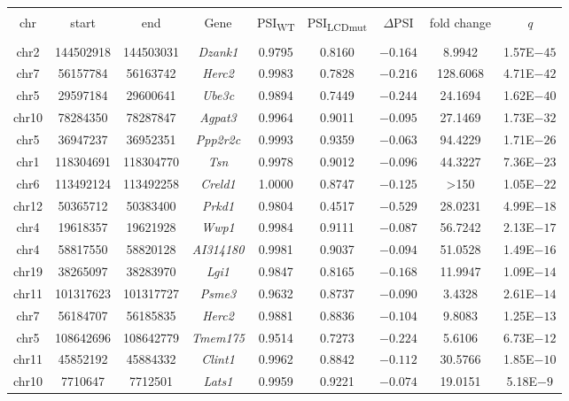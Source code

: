 \begin{appendices}
\begin{table}[!htbp]
\begin{tabular}{@{\extracolsep{5pt}} ccccccccc}
	\\[-1.8ex]\hline 
	\hline \\[-1.8ex] 
	chr & start & end & Gene & PSI\textsubscript{WT} & PSI\textsubscript{LCDmut} & $\Delta$PSI & fold change & \textit{q} \\ 
	\hline \\[-1.8ex] 
	chr2 & 144502918 &144503031 & \textit{Dzank1} & 0.9795 & 0.8160 & $-0.164$ & 8.9942 & 1.57E$-45$ \\ 
	chr7 & 56157784 & 56163742 & \textit{Herc2} & 0.9983 & 0.7828 & $-0.216$ & 128.6068 & 4.71E$-42$\\ 
	chr5 & 29597184 & 29600641 & \textit{Ube3c} & 0.9894 & 0.7449 & $-0.244$ & 24.1694 & 1.62E$-40$\\ 
	chr10 & 78284350 & 78287847 & \textit{Agpat3} & 0.9964 & 0.9011 & $-0.095$ & 27.1469 & 1.73E$-32$ \\ 
	chr5 & 36947237 & 36952351 & \textit{Ppp2r2c} & 0.9993 & 0.9359 & $-0.063$ & 94.4229 & 1.71E$-26$\\ 
	chr1 & 118304691  &118304770& \textit{Tsn} & 0.9978 & 0.9012 & $-0.096$ & 44.3227 & 7.36E$-23$ \\ 
	chr6 & 113492124  & 113492258 & \textit{Creld1} & 1.0000 & 0.8747 & $-0.125$ & \textgreater 150 & 1.05E$-22$ \\ 
	chr12 & 50365712 & 50383400 & \textit{Prkd1} & 0.9804 & 0.4517 & $-0.529$ & 28.0231 & 4.99E$-18$\\ 
	chr4 & 19618357 & 19621928 & \textit{Wwp1} & 0.9984 & 0.9111 & $-0.087$ & 56.7242 & 2.13E$-17$ \\ 
	chr4 & 58817550 & 58820128 & \textit{AI314180} & 0.9981 & 0.9037 & $-0.094$ & 51.0528 & 1.49E$-16$\\ 
	chr19 & 38265097 & 38283970 & \textit{Lgi1} & 0.9847 & 0.8165 & $-0.168$ & 11.9947 & 1.09E$-14$\\ 
	chr11 & 101317623  &101317727 & \textit{Psme3} & 0.9632 & 0.8737 & $-0.090$ & 3.4328 & 2.61E$-14$\\ 
	chr7 & 56184707 & 56185835 & \textit{Herc2} & 0.9881 & 0.8836 & $-0.104$ & 9.8083 & 1.25E$-13$\\ 
	chr5 & 108642696  & 108642779& \textit{Tmem175} & 0.9514 & 0.7273 & $-0.224$ & 5.6106 & 6.73E$-12$\\ 
	chr11 & 45852192 & 45884332 & \textit{Clint1} & 0.9962 & 0.8842 & $-0.112$ & 30.5766 & 1.85E$-10$ \\ 
	chr10 & 7710647 & 7712501 & \textit{Lats1} & 0.9959 & 0.9221 & $-0.074$ & 19.0151 & 5.18E$-9$\\ 

\end{tabular}
\end{table}
\end{appendices}
